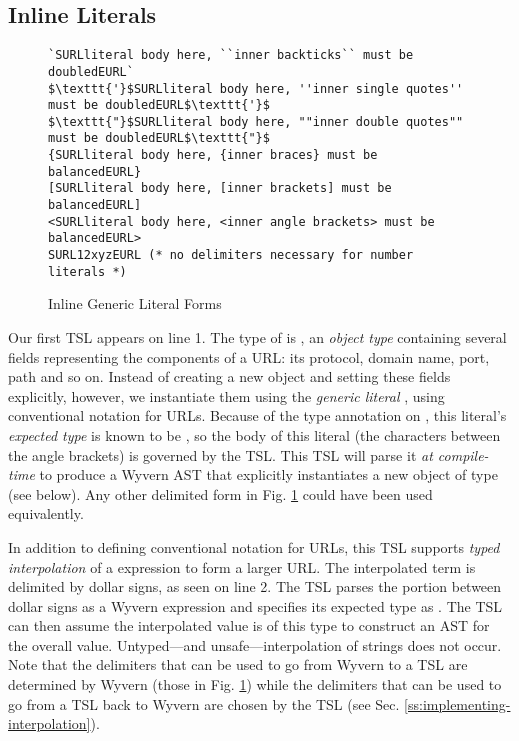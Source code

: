 \subsection{Inline Literals}
\begin{figure}[t]
\begin{lstlisting}
`SURLliteral body here, ``inner backticks`` must be doubledEURL`
$\texttt{'}$SURLliteral body here, ''inner single quotes'' must be doubledEURL$\texttt{'}$
$\texttt{"}$SURLliteral body here, ""inner double quotes"" must be doubledEURL$\texttt{"}$
{SURLliteral body here, {inner braces} must be balancedEURL}
[SURLliteral body here, [inner brackets] must be balancedEURL]
<SURLliteral body here, <inner angle brackets> must be balancedEURL>
SURL12xyzEURL (* no delimiters necessary for number literals *)
\end{lstlisting}
\vspace{-8px}
\caption{Inline Generic Literal Forms}
\vspace{-10px}
\label{f-delims}
\end{figure}
Our first TSL appears on line 1. The type of  is , an \emph{object type} containing several fields representing the components of a URL: its protocol, domain name, port, path and so on. Instead of creating a new object and setting these fields explicitly, however, we instantiate them using the \emph{generic literal} , using conventional notation for URLs. Because of the type annotation on , this literal's \emph{expected type} is known to be , so the body of this literal (the characters between the angle brackets) is governed by the  TSL. This TSL will parse it \emph{at compile-time} to produce a Wyvern AST that explicitly instantiates a new object of type   (see below). Any other delimited form in Fig. \ref{f-delims} could have been used equivalently.

In addition to defining conventional notation for URLs, this TSL supports \emph{typed interpolation}
of a  expression to form a larger URL. The interpolated term is delimited by dollar signs,
as seen on line 2. The TSL parses the portion between dollar signs as a Wyvern expression and
specifies its expected type as  . The TSL can then assume the interpolated value is of this
type to construct an AST for the overall value. Untyped---and unsafe---interpolation of strings
does not occur. Note that the delimiters that can be used to go from Wyvern to a TSL are determined by Wyvern (those in Fig. \ref{f-delims}) while the delimiters that can be used to go from a TSL back to Wyvern are chosen by the TSL (see Sec. \ref{ss:implementing-interpolation}).

